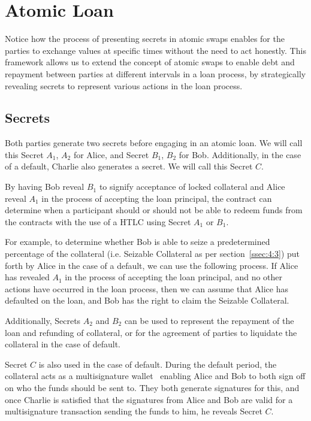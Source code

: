 \documentclass{llncs}
\begin{document}
\section{Atomic Loan}

Notice how the process of presenting secrets in atomic swaps enables for the parties to exchange values at specific times without the need to act honestly. This framework allows us to extend the concept of atomic swaps to enable debt and repayment between parties at different intervals in a loan process, by strategically revealing secrets to represent various actions in the loan process. 

\subsection{Secrets}

Both parties generate two secrets before engaging in an atomic loan. We will call this Secret $A_1$, $A_2$ for Alice, and Secret $B_1$, $B_2$ for Bob. Additionally, in the case of a default, Charlie also generates a secret. We will call this Secret $C$. 

By having Bob reveal $B_1$ to signify acceptance of locked collateral and Alice reveal $A_1$ in the process of accepting the loan principal, the contract can determine when a participant should or should not be able to redeem funds from the contracts with the use of a HTLC using Secret $A_1$ or $B_1$. 

For example, to determine whether Bob is able to seize a predetermined percentage of the collateral (i.e. Seizable Collateral as per section~\ref{ssec:4:3}) put forth by Alice in the case of a default, we can use the following process. If Alice has revealed $A_1$ in the process of accepting the loan principal, and no other actions have occurred in the loan process, then we can assume that Alice has defaulted on the loan, and Bob has the right to claim the Seizable Collateral.

Additionally, Secrets $A_2$ and $B_2$ can be used to represent the repayment of the loan and refunding of collateral, or for the agreement of parties to liquidate the collateral in the case of default. 

Secret $C$ is also used in the case of default. During the default period, the collateral acts as a multisignature wallet~\cite{ref_article10} enabling Alice and Bob to both sign off on who the funds should be sent to. They both generate signatures for this, and once Charlie is satisfied that the signatures from Alice and Bob are valid for a multisignature transaction sending the funds to him, he reveals Secret $C$. 
\end{document}
